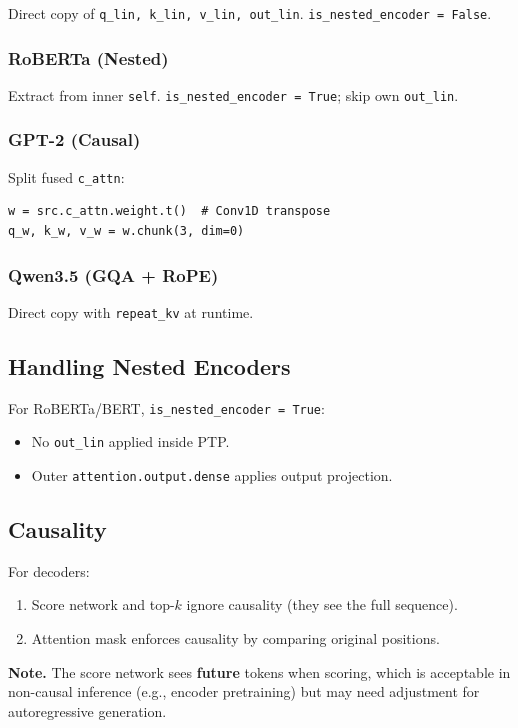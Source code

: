Direct copy of \texttt{q\_lin, k\_lin, v\_lin, out\_lin}. \texttt{is\_nested\_encoder = False}.

\subsubsection{RoBERTa (Nested)}

Extract from inner \texttt{self}. \texttt{is\_nested\_encoder = True}; skip own \texttt{out\_lin}.

\subsubsection{GPT-2 (Causal)}

Split fused \texttt{c\_attn}:

\begin{lstlisting}
w = src.c_attn.weight.t()  # Conv1D transpose
q_w, k_w, v_w = w.chunk(3, dim=0)
\end{lstlisting}

\subsubsection{Qwen3.5 (GQA + RoPE)}

Direct copy with \texttt{repeat\_kv} at runtime.

\subsection{Handling Nested Encoders}

For RoBERTa/BERT, \texttt{is\_nested\_encoder = True}:
\begin{itemize}
\item No \texttt{out\_lin} applied inside PTP.
\item Outer \texttt{attention.output.dense} applies output projection.

\end{itemize}
\subsection{Causality}

For decoders:
\begin{enumerate}
\item Score network and top-$k$ ignore causality (they see the full sequence).
\item Attention mask enforces causality by comparing original positions.

\end{enumerate}
\textbf{Note.} The score network sees \textbf{future} tokens when scoring, which is 
acceptable in non-causal inference (e.g., encoder pretraining) but may 
need adjustment for autoregressive generation.

